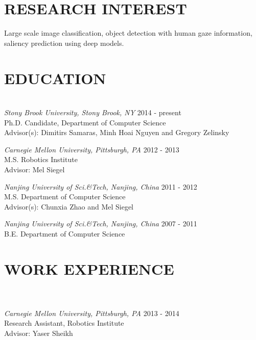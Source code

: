 \documentclass[margin, 11pt]{res} %
\begin{document}
\begin{resume}



\section{RESEARCH INTEREST}  
Large scale image classification, object detection with human gaze information, saliency prediction using deep models. 

\section{EDUCATION}
~\\
{\sl Stony Brook University, Stony Brook, NY}  \hfill  2014 - present \\
Ph.D. Candidate, Department of Computer Science\\
Advisor(s): Dimitirs Samaras, Minh Hoai Nguyen and Gregory Zelinsky

{\sl Carnegie Mellon University, Pittsburgh, PA}  \hfill 2012 - 2013 \\
M.S. Robotics Institute\\
Advisor: Mel Siegel

{\sl Nanjing University of Sci.\&Tech, Nanjing, China}  \hfill  2011 - 2012 \\
M.S. Department of Computer Science \\
Advisor(s): Chunxia Zhao and Mel Siegel


{\sl Nanjing University of Sci.\&Tech, Nanjing, China}  \hfill  2007 - 2011 \\
B.E. Department of Computer Science \\

 \section{WORK EXPERIENCE}
 ~\\
 ~\\
{\sl Carnegie Mellon University, Pittsburgh, PA}  \hfill 2013 - 2014 \\
Research Assistant, Robotics Institute\\
Advisor: Yaser Sheikh


\end{resume}
\end{document}
